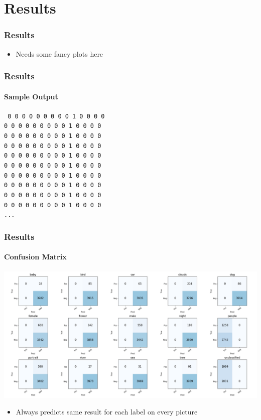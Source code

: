 \newcommand{\overtitle}{Results}
\section{Results}

\begin{frame}
	\frametitle{\overtitle}
	\begin{itemize}
		\item Needs some fancy plots here
	\end{itemize}
\end{frame}

\begin{frame}
	\frametitle{\overtitle}
	\framesubtitle{Sample Output}
	\begin{centering}
	\texttt{%
		0 0 0 0 0 0 0 0 0 1 0 0 0 0 \\
		0 0 0 0 0 0 0 0 0 1 0 0 0 0 \\
		0 0 0 0 0 0 0 0 0 1 0 0 0 0 \\
		0 0 0 0 0 0 0 0 0 1 0 0 0 0 \\
		0 0 0 0 0 0 0 0 0 1 0 0 0 0 \\
		0 0 0 0 0 0 0 0 0 1 0 0 0 0 \\
		0 0 0 0 0 0 0 0 0 1 0 0 0 0 \\
		0 0 0 0 0 0 0 0 0 1 0 0 0 0 \\
		0 0 0 0 0 0 0 0 0 1 0 0 0 0 \\
		0 0 0 0 0 0 0 0 0 1 0 0 0 0 \\
		...
		}
	\end{centering}
\end{frame}

\begin{frame}
	\frametitle{\overtitle}
	\framesubtitle{Confusion Matrix}
	\includegraphics[width=\textwidth]{images/final_model_confusion.png}
	\begin{itemize}
		\item Always predicts same result for each label on every picture
	\end{itemize}
\end{frame}

